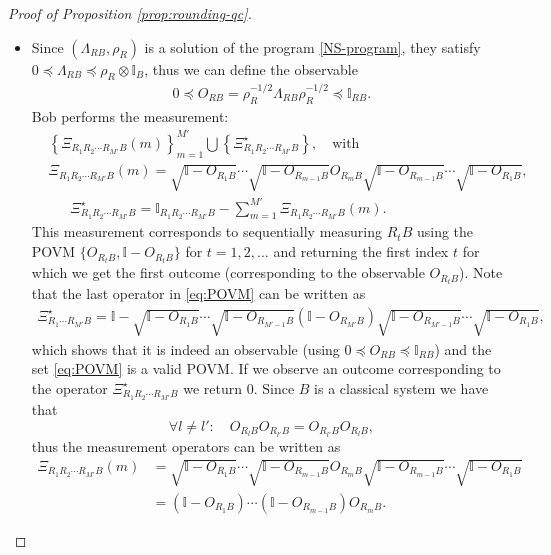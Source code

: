 \documentclass[a4paper,onecolumn,11pt,accepted=2025-10-01]{quantumarticle}
\newcommand*{\dI}{\mathbb{I}}
\newcommand*{\mle}{\preccurlyeq}
\begin{document}
\begin{proof}[Proof of Proposition \ref{prop:rounding-qc}]
\begin{itemize}
    \item[\textbf{Decoding.}] Since $(\Lambda_{RB}, \rho_{R})$ is a solution of the program \eqref{NS-program}, they satisfy $0\mle \Lambda_{RB}\mle \rho_R\otimes \dI_B$,  thus we can define the observable
    \begin{align}
        0\mle O_{RB} = \rho_R^{-1/2} \Lambda_{RB}\rho_R^{-1/2} \mle \dI_{RB}.
    \end{align}
    Bob performs the measurement:
    \begin{align}
       & \left\{ \Xi_{R_1R_2\cdots R_{M'} B}(m) \right\}_{m=1}^{M'} \bigcup \left\{ \Xi_{R_1R_2\cdots R_{M'} B}^{\star} \right\}, \quad \text{with }\label{eq:POVM}
        \\ & \Xi_{R_1R_2\cdots R_{M'} B}(m) = \sqrt{\dI-O_{R_{1}B}}\cdots\sqrt{\dI-O_{R_{m-1}B}}O_{R_mB}\sqrt{\dI-O_{R_{m-1}B}}\cdots \sqrt{\dI-O_{R_{1}B}},
        \\ &\quad \;\;  \Xi_{R_1R_2\cdots R_{M'} B}^{\star} = \dI_{R_1R_2\cdots R_{M'} B} - \sum_{m=1}^{M'}\Xi_{R_1R_2\cdots R_{M'} B}(m).\label{eq:POVM-last}
    \end{align}
    This measurement corresponds to sequentially measuring $R_tB$ using the POVM $\{O_{R_tB}, \dI- O_{R_tB}\}$ for $t=1,2, \dots$ and returning the first index $t$ for which we get the first outcome (corresponding to the observable $O_{R_tB}$). 
    Note that the last operator in \eqref{eq:POVM} can be written as
    \begin{align}
    \Xi_{R_1\cdots R_{M'} B}^{\star}=\dI\!-\!\sqrt{\dI\!-\!O_{R_{1}B}}\cdots\sqrt{\dI\!-\!O_{R_{M'-1}B}}(\dI\!-\!O_{R_{M'}B})\sqrt{\dI\!-\!O_{R_{M'-1}B}}\cdots \sqrt{\dI\!-\!O_{R_{1}B}},
    \end{align}
    which shows that it is indeed an observable (using $0\mle O_{RB}\mle \dI_{RB}$) and the set  \eqref{eq:POVM} is a valid POVM. 
   If we observe an outcome corresponding to the operator $\Xi_{R_1R_2\cdots R_{M'} B}^{\star}$ we return $0$.
    Since $B$ is a classical system we have that
    \begin{equation}
       \forall l\neq l' : \quad  O_{R_{l}B}O_{R_{l'}B} = O_{R_{l'}B}O_{R_{l}B},
    \end{equation}
   thus the measurement operators can be written as 
    \begin{align}
        \Xi_{R_1R_2\cdots R_{M'} B}(m) &= \sqrt{\dI-O_{R_{1}B}}\cdots\sqrt{\dI-O_{R_{m-1}B}}O_{R_mB}\sqrt{\dI-O_{R_{m-1}B}}\cdots \sqrt{\dI-O_{R_{1}B}}
        \\&= (\dI-O_{R_{1}B})\cdots(\dI-O_{R_{m-1}B})O_{R_mB}.\label{eq:povm-simple}
    \end{align}
\end{itemize}




\end{proof}
\end{document}
